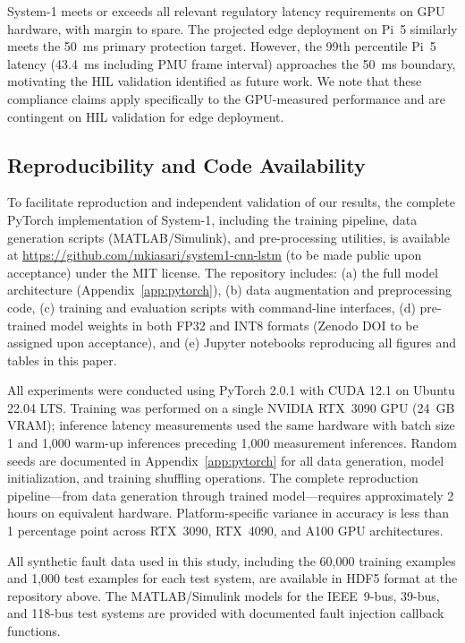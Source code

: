 \documentclass[journal]{IEEEtran}
\begin{document}
System-1 meets or exceeds all relevant regulatory latency requirements on GPU hardware, with margin to spare. The projected edge deployment on Pi~5 similarly meets the 50~ms primary protection target. However, the 99th percentile Pi~5 latency (43.4~ms including PMU frame interval) approaches the 50~ms boundary, motivating the HIL validation identified as future work. We note that these compliance claims apply specifically to the GPU-measured performance and are contingent on HIL validation for edge deployment.

\subsection{Reproducibility and Code Availability}

To facilitate reproduction and independent validation of our results, the complete PyTorch implementation of System-1, including the training pipeline, data generation scripts (MATLAB/Simulink), and pre-processing utilities, is available at \url{https://github.com/mkiasari/system1-cnn-lstm} (to be made public upon acceptance) under the MIT license. The repository includes: (a) the full model architecture (Appendix~\ref{app:pytorch}), (b) data augmentation and preprocessing code, (c) training and evaluation scripts with command-line interfaces, (d) pre-trained model weights in both FP32 and INT8 formats (Zenodo DOI to be assigned upon acceptance), and (e) Jupyter notebooks reproducing all figures and tables in this paper.

All experiments were conducted using PyTorch 2.0.1 with CUDA 12.1 on Ubuntu 22.04 LTS. Training was performed on a single NVIDIA RTX~3090 GPU (24~GB VRAM); inference latency measurements used the same hardware with batch size 1 and 1,000 warm-up inferences preceding 1,000 measurement inferences. Random seeds are documented in Appendix~\ref{app:pytorch} for all data generation, model initialization, and training shuffling operations. The complete reproduction pipeline---from data generation through trained model---requires approximately 2 hours on equivalent hardware. Platform-specific variance in accuracy is less than 1 percentage point across RTX~3090, RTX~4090, and A100 GPU architectures.

All synthetic fault data used in this study, including the 60,000 training examples and 1,000 test examples for each test system, are available in HDF5 format at the repository above. The MATLAB/Simulink models for the IEEE~9-bus, 39-bus, and 118-bus test systems are provided with documented fault injection callback functions.
\end{document}
